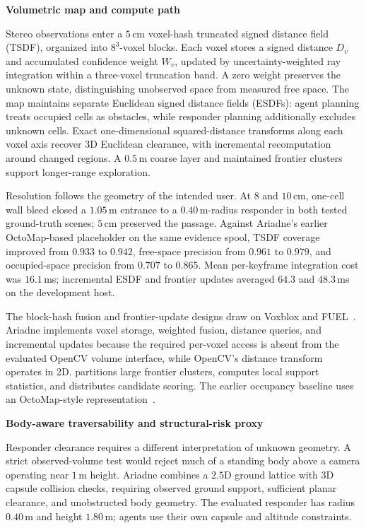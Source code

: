 \documentclass[10pt,a4paper]{article}
\newcommand{\code}[1]{\texttt{\small\detokenize{#1}}}
\newcommand{\indentedheading}[1]{\par\addvspace{0.65em}\noindent\hspace*{1em}\textbf{#1}\par\smallskip}
\begin{document}
\indentedheading{Volumetric map and compute path}

Stereo observations enter a $5$\,cm voxel-hash truncated signed distance
field (TSDF), organized into $8^3$-voxel blocks. Each voxel stores a signed
distance $D_v$ and accumulated confidence weight $W_v$, updated by
uncertainty-weighted ray integration within a three-voxel truncation band.
A zero weight preserves the unknown state, distinguishing unobserved space
from measured free space. The map maintains separate Euclidean signed
distance fields (ESDFs): agent planning treats occupied cells as obstacles,
while responder planning additionally excludes unknown cells. Exact
one-dimensional squared-distance transforms along each voxel axis recover
3D Euclidean clearance, with incremental recomputation around changed
regions. A $0.5$\,m coarse layer and maintained frontier clusters support
longer-range exploration.

Resolution follows the geometry of the intended user. At $8$ and $10$\,cm,
one-cell wall bleed closed a $1.05$\,m entrance to a $0.40$\,m-radius
responder in both tested ground-truth scenes; $5$\,cm preserved the passage.
Against Ariadne's earlier OctoMap-based placeholder on the same evidence
spool, TSDF coverage improved from $0.933$ to \textbf{$0.942$},
free-space precision from $0.961$ to $0.979$, and occupied-space precision
from $0.707$ to \textbf{$0.865$}. Mean per-keyframe integration cost was
$16.1$\,ms; incremental ESDF and frontier updates averaged $64.3$ and
$48.3$\,ms on the development host.

The block-hash fusion and frontier-update designs draw on Voxblox and
FUEL~\cite{voxblox2017,fuel2021}. Ariadne implements voxel storage,
weighted fusion, distance queries, and incremental updates because the
required per-voxel access is absent from the evaluated OpenCV volume
interface, while OpenCV's distance transform operates in 2D.
\code{cv::PCA} partitions large frontier clusters,
\code{cv::filter2D} computes local support statistics, and
\code{cv::parallel_for\_} distributes candidate scoring.
The earlier occupancy baseline uses an OctoMap-style
representation~\cite{octomap2013}.

\indentedheading{Body-aware traversability and structural-risk proxy}

Responder clearance requires a different interpretation of unknown
geometry. A strict observed-volume test would reject much of a standing
body above a camera operating near $1$\,m height. Ariadne combines a
$2.5$D ground lattice with 3D capsule collision checks, requiring
observed ground support, sufficient planar clearance, and unobstructed
body geometry. The evaluated responder has radius $0.40$\,m and height
$1.80$\,m; agents use their own capsule and altitude constraints.
\end{document}
